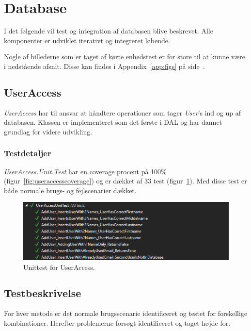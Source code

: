 \section{Database}\label{sec:testdatabase}
I det følgende vil test og integration af databasen blive beskrevet. Alle komponenter er udviklet iterativt og integreret løbende.

Nogle af billederne som er taget af kørte enhedstest er for store til at kunne være i nedstående afsnit. Disse kan findes i Appendix~\ref{app:figs} på side~\pageref{app:figs}.

\subsection{UserAccess}
\textit{UserAccess} har til ansvar at håndtere operationer som tager \textit{User}'s ind og up af databasen. Klassen er implementeret som det første i DAL og har dannet grundlag for videre udvikling.

\subsubsection{Testdetaljer}
\textit{UserAccess.Unit.Test} har en coverage procent på 100\% (figur~\ref{fig:useraccesscoverage}) og er dækket af 33 test (figur~\ref{fig:useraccessunittest}). Med disse test er både normale brugs- og fejlscenarier dækket.

\begin{figure}[h]
\centering
\includegraphics[width=0.9\linewidth]{figs/test/useraccessunittest}
\caption{Unittest for UserAccess.}
\label{fig:useraccessunittest}
\end{figure}

\subsection{Testbeskrivelse}
For hver metode er det normale brugsscenarie identificeret og testet for forskellige kombinationer. Herefter problemerne forsøgt identificeret og taget højde for.

